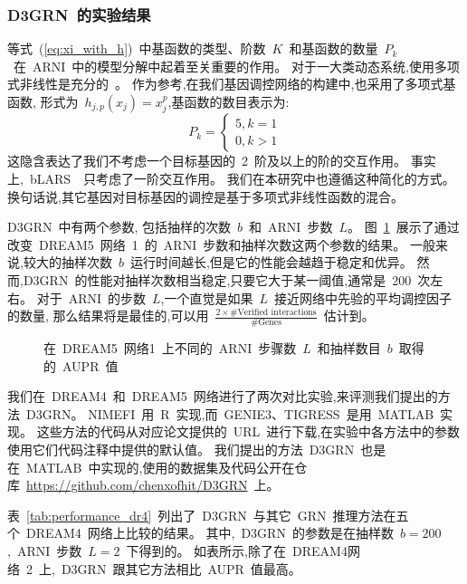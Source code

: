 \subsubsection{D3GRN~的实验结果}
等式~(\ref{eq:xi_with_h})~中基函数的类型、阶数~$K$~和基函数的数量~$P_k$~在~ARNI~中的模型分解中起着至关重要的作用。
对于一大类动态系统,使用多项式非线性是充分的~\cite{mangan2016inferring}。
作为参考,在我们基因调控网络的构建中,也采用了多项式基函数,
形式为~$h_{j,p}(x_j)=x_j^p$,基函数的数目表示为: 
\begin{equation}
P_k=\left\{\begin{matrix}
5,  k=1\\ 
0,  k>1
\end{matrix}\right. 
\end{equation}
这隐含表达了我们不考虑一个目标基因的~2~阶及以上的阶的交互作用。
事实上,~bLARS~\cite{singh2016blars}~只考虑了一阶交互作用。
我们在本研究中也遵循这种简化的方式。
换句话说,其它基因对目标基因的调控是基于多项式非线性函数的混合。

D3GRN~中有两个参数,
包括抽样的次数~$b$~和~ARNI~步数~$L$。
图~\ref{fig:performance_dr5}~展示了通过改变~DREAM5~网络~1~的~ARNI~步数和抽样次数这两个参数的结果。
一般来说,较大的抽样次数~$b$~运行时间越长,但是它的性能会越趋于稳定和优异。
然而,D3GRN~的性能对抽样次数相当稳定,只要它大于某一阈值,通常是~200~次左右。
对于~ARNI~的步数~$L$,一个直觉是如果~$L$~接近网络中先验的平均调控因子的数量,
那么结果将是最佳的,可以用~$\frac{2  \times \#\text{Verified interactions}}{\#\text{Genes}}$~估计到。
 
\begin{figure}[!htbp]
\centering

\caption{
在~DREAM5~网络1~上不同的~ARNI~步骤数~$L$~和抽样数目~$b$~取得的~AUPR~值}

\label{fig:performance_dr5}
\end{figure}

我们在~DREAM4~和~DREAM5~网络进行了两次对比实验,来评测我们提出的方法~D3GRN。
NIMEFI~用~R~实现,而~GENIE3、TIGRESS~是用~MATLAB~实现。
这些方法的代码从对应论文提供的~URL~进行下载,在实验中各方法中的参数使用它们代码注释中提供的默认值。
我们提出的方法~D3GRN~也是在~MATLAB~中实现的,使用的数据集及代码公开在仓库~\url{https://github.com/chenxofhit/D3GRN}~上。

表~\ref{tab:performance_dr4}~列出了~D3GRN~与其它~GRN~推理方法在五个~DREAM4~网络上比较的结果。
其中,~D3GRN~的参数是在抽样数~$b=200$,~ARNI~步数~$L=2$~下得到的。
如表所示,除了在~DREAM4网络~2~上,~D3GRN~跟其它方法相比~AUPR~值最高。


